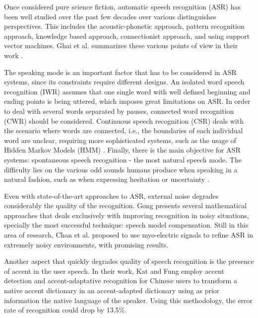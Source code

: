 \documentclass[]{article}
\begin{document}


Once considered pure science fiction, automatic speech recognition (ASR) has been well studied over the past few decades
over various distinguishes perspectives. This includes the acoustic-phonetic approach, pattern recognition approach, knowledge
based approach, connectionist approach, and using support vector machines. Ghai et al. summarizes these various points of view
in their work \cite{GhaiSingh}.


The speaking mode is an important factor that has to be considered in ASR systems, since its constraints require different
designs. An isolated word speech recognition (IWR) assumes that one single word with well defined beginning and ending points
is being uttered, which imposes great limitations on ASR. In order to deal with several words separated by pauses, connected
word recognition (CWR) should be considered. Continuous speech recognition (CSR) deals with the scenario where words are
connected, i.e., the boundaries of each individual word are unclear, requiring more sophisticated systems, such as the usage of
Hidden Markov Models (HMM) \cite{Young2001}. Finally, there is the main objective for ASR systems: spontaneous speech recognition - the most natural
speech mode. The difficulty lies on the various odd sounds humans produce when speaking in a natural fashion, such as when expressing hesitation
or uncertainty \cite{GhaiSingh}.


Even with state-of-the-art approaches to ASR, external noise degrades considerably the quality of the recognition. Gong \cite{Gong1995261}
presents several mathematical approaches that deals exclusively with improving recognition in noisy situations, specially the most
successful technique: speech model compensation. Still in this area of research, Chan et al. \cite{Chan2001} proposed to use myo-electric signals to
refine ASR in extremely noisy environments, with promising results.


Another aspect that quickly degrades quality of speech recognition is the presence of accent in the user speech. In their work,
Kat and Fung \cite{KatFung758102} employ accent detection and accent-adaptative recognition for Chinese users to transform a native
accent dictionary in an accent-adapted dictionary using as prior information the native language of the speaker. Using this
methodology, the error rate of recognition could drop by 13.5\%.
\end{document}
